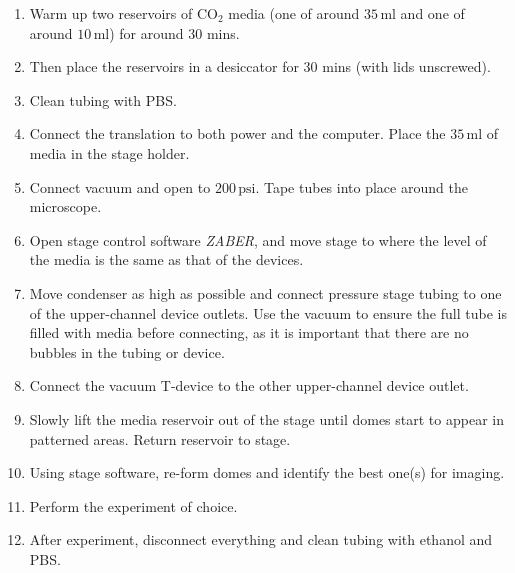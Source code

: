 \begin{enumerate}
 \setlength\itemsep{-0.1em}
	\item Warm up two reservoirs of CO$_2$ media (one of around $35 \, \text{ml}$ and one of around $10 \, \text{ml}$) for around 30 mins.
	\item Then place the reservoirs in a desiccator for 30 mins (with lids unscrewed).
	\item Clean tubing with PBS.
	\item Connect the translation to both power and the computer. Place the $35 \, \text{ml}$ of media in the stage holder.
	\item Connect vacuum and open to  $200 \, \text{psi}$. Tape tubes into place around the microscope.
	\item Open stage control software \textit{ZABER}, and move stage to where the level of the media is the same as that of the devices.
	\item Move condenser as high as possible and connect pressure stage tubing to one of the upper-channel device outlets. Use the vacuum to ensure the full tube is filled with media before connecting, as it is important that there are no bubbles in the tubing or device.
	\item Connect the vacuum T-device to the other upper-channel device outlet.
	\item Slowly lift the media reservoir out of the stage until domes start to appear in patterned areas. Return reservoir to stage.
	\item Using stage software, re-form domes and identify the best one(s) for imaging.
	\item Perform the experiment of choice.
	\item After experiment, disconnect everything and clean tubing with ethanol and PBS.
\end{enumerate}
